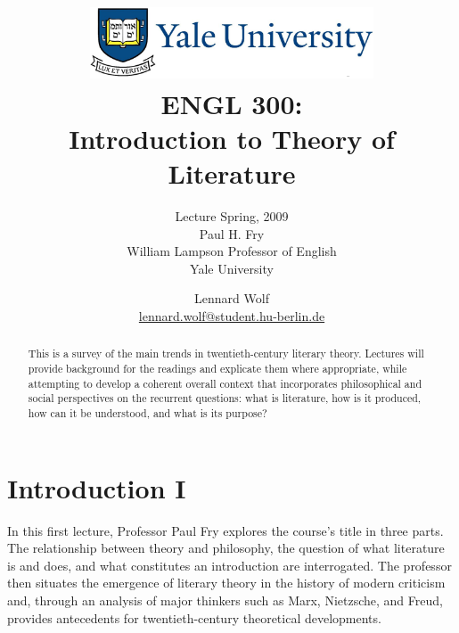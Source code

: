 \documentclass[]{scrartcl}
\begin{document}
\title{
	\includegraphics*[width=0.63\textwidth]{images/yale_logo.png}\\
	\vspace{24pt}
	ENGL 300:\\Introduction to Theory of Literature}
\subtitle{Lecture Spring, 2009\\
          Paul H. Fry\\
          William Lampson Professor of English \\ 
          Yale University}
\author{Lennard Wolf\\
        \href{mailto:lennard.wolf@student.hu-berlin.de}{lennard.wolf@student.hu-berlin.de}}
\maketitle
\begin{abstract}

This is a survey of the main trends in twentieth-century literary theory. Lectures will provide background for the readings and explicate them where appropriate, while attempting to develop a coherent overall context that incorporates philosophical and social perspectives on the recurrent questions: what is literature, how is it produced, how can it be understood, and what is its purpose?

\end{abstract}
\newpage

\tableofcontents

\listoffigures
\newpage


\section{Introduction I}
\vspace{15pt}

In this first lecture, Professor Paul Fry explores the course's title in three parts. The relationship between theory and philosophy, the question of what literature is and does, and what constitutes an introduction are interrogated. The professor then situates the emergence of literary theory in the history of modern criticism and, through an analysis of major thinkers such as Marx, Nietzsche, and Freud, provides antecedents for twentieth-century theoretical developments.
\end{document}
